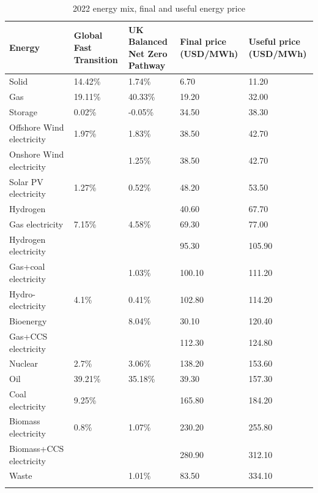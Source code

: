 \begin{longtable}{P{5cm}P{3cm}P{2cm}P{3cm}P{3cm}}
\caption{2022 energy mix, final and useful energy price} \\ 
  \hline
Energy & Global Fast Transition & UK Balanced Net Zero Pathway & Final price (USD/MWh) & Useful price (USD/MWh) \\ 
  \hline
Solid & 14.42\% & 1.74\% & 6.70 & 11.20 \\ 
  Gas & 19.11\% & 40.33\% & 19.20 & 32.00 \\ 
  Storage & 0.02\% & -0.05\% & 34.50 & 38.30 \\ 
  Offshore Wind electricity & 1.97\% & 1.83\% & 38.50 & 42.70 \\ 
  Onshore Wind electricity &  & 1.25\% & 38.50 & 42.70 \\ 
  Solar PV electricity & 1.27\% & 0.52\% & 48.20 & 53.50 \\ 
  Hydrogen &  &  & 40.60 & 67.70 \\ 
  Gas electricity & 7.15\% & 4.58\% & 69.30 & 77.00 \\ 
  Hydrogen electricity &  &  & 95.30 & 105.90 \\ 
  Gas+coal electricity &  & 1.03\% & 100.10 & 111.20 \\ 
  Hydro-electricity & 4.1\% & 0.41\% & 102.80 & 114.20 \\ 
  Bioenergy &  & 8.04\% & 30.10 & 120.40 \\ 
  Gas+CCS electricity &  &  & 112.30 & 124.80 \\ 
  Nuclear & 2.7\% & 3.06\% & 138.20 & 153.60 \\ 
  Oil & 39.21\% & 35.18\% & 39.30 & 157.30 \\ 
  Coal electricity & 9.25\% &  & 165.80 & 184.20 \\ 
  Biomass electricity & 0.8\% & 1.07\% & 230.20 & 255.80 \\ 
  Biomass+CCS electricity &  &  & 280.90 & 312.10 \\ 
  Waste &  & 1.01\% & 83.50 & 334.10 \\ 
   \hline
\hline
\label{tab_initial_price_energy}
\end{longtable}
